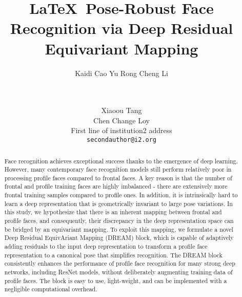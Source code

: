 \documentclass{article}
\begin{document}
\title{\LaTeX\ Pose-Robust Face Recognition via Deep Residual Equivariant Mapping}
\author{Kaidi Cao  Yu Rong  Cheng Li\\
\\
\\
{}
\and
Xiaoou Tang\\
Chen Change Loy\\
First line of institution2 address\\
{\tt\small secondauthor@i2.org}
}

\maketitle
\begin{abstract}
Face recognition achieves exceptional success thanks to the emergence of deep learning. However, many contemporary face recognition models still perform relatively poor in processing profile faces compared to frontal faces. A key reason is that the number of frontal and profile training faces are highly imbalanced - there are extensively more frontal training samples compared to profile ones. In addition, it is intrinsically hard to learn a deep representation that is geometrically invariant to large pose variations. In this study, we hypothesize that there is an inherent mapping between frontal and profile faces, and consequently, their discrepancy in the deep representation space can be bridged by an equivariant mapping. To exploit this mapping, we formulate a novel Deep Residual EquivAriant Mapping (DREAM) block, which is capable of adaptively adding residuals to the input deep representation to transform a profile face representation to a canonical pose that simplifies recognition. The DREAM block consistently enhances the performance of profile face recognition for many strong deep networks, including ResNet models, without deliberately augmenting training data of profile faces. The block is easy to use, light-weight, and can be implemented with a negligible computational overhead.
\end{abstract}
\end{document}
